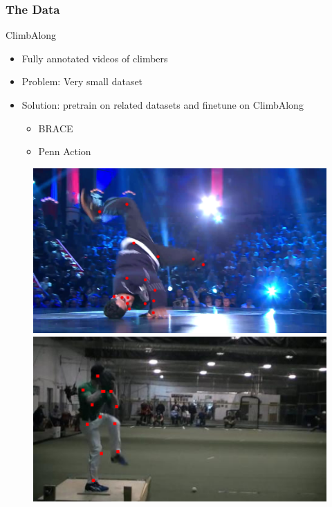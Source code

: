 \documentclass{beamer}
\begin{document}
\begin{frame}
    \frametitle{The Data}
    \begin{minipage}{0.5\textwidth}
        ClimbAlong
        \begin{itemize}
            \item Fully annotated videos of climbers
            \item Problem: Very small dataset
            \item Solution: pretrain on related datasets and finetune on ClimbAlong
            \begin{itemize}
                \item BRACE
                \item Penn Action
            \end{itemize}
        \end{itemize}
    \end{minipage} \hfill
    \begin{minipage}{0.45\textwidth}
        \begin{figure}
            \center
            \includegraphics[width = \textwidth]{../report/entities/BRACE_1152.png}
            \includegraphics[width = \textwidth]{../report/entities/PA_64.png}
        \end{figure}
    \end{minipage}
\end{frame}
\end{document}
